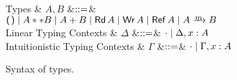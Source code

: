 \begin{figure*}
  \begin{grammar}
    Types
    & $A,B$
    &$\mathrel{::=}$& $\tyUnit \bnfalt \tyProd{A}{B} \bnfalt \tySum{A}{B} \bnfalt \tyRd{A} \bnfalt
    \tyWr{A} \bnfalt \tyRef{A} \bnfalt \tyArr{A}{\footnotesize $m$}{B}$
    \\
    Linear Typing Contexts
    & $\Delta$
    &$\mathrel{::=}$& $\cdot \mathrel{\mid} \Delta,x:A$
    \\
    Intuitionistic Typing Contexts
    & $\Gamma$
    &$\mathrel{::=}$& $\cdot \mathrel{\mid} \Gamma,x:A$
  \end{grammar}
\caption{Syntax of types.}
\label{fig:syntax--types}
\end{figure*}
